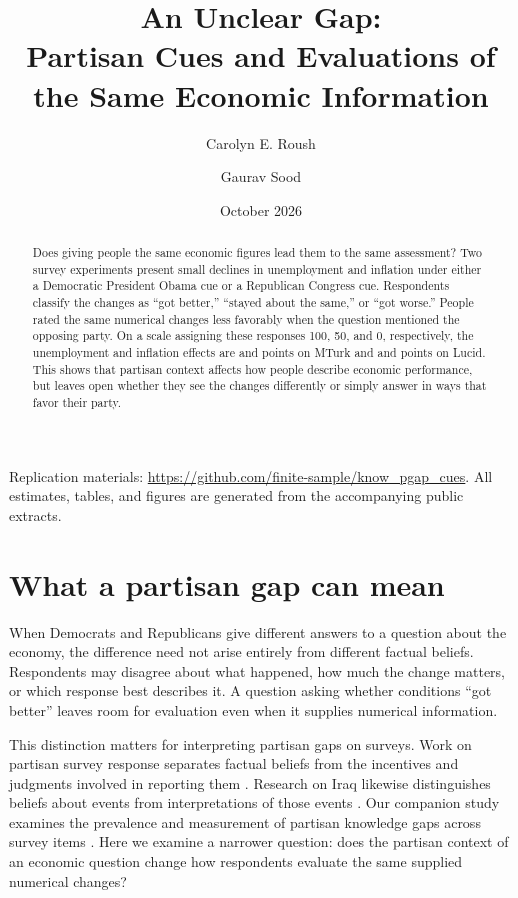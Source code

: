 \documentclass[11pt,letterpaper]{article}
\title{An Unclear Gap:\\Partisan Cues and Evaluations of\\the Same Economic Information}
\author{Carolyn E. Roush \and Gaurav Sood}
\date{October 2026}
\begin{document}
\maketitle
\begin{abstract}
\noindent Does giving people the same economic figures lead them to the same assessment? Two survey experiments present small declines in unemployment and inflation under either a Democratic President Obama cue or a Republican Congress cue. Respondents classify the changes as ``got better,'' ``stayed about the same,'' or ``got worse.'' People rated the same numerical changes less favorably when the question mentioned the opposing party. On a scale assigning these responses 100, 50, and 0, respectively, the unemployment and inflation effects are \MTurkunemploymentestimate{} and \MTurkinflationestimate{} points on MTurk and \Lucidunemploymentestimate{} and \Lucidinflationestimate{} points on Lucid. This shows that partisan context affects how people describe economic performance, but leaves open whether they see the changes differently or simply answer in ways that favor their party.
\end{abstract}
\vspace{1em}
\noindent\small Replication materials: \url{https://github.com/finite-sample/know_pgap_cues}. All estimates, tables, and figures are generated from the accompanying public extracts.\normalsize
\newpage
\section{What a partisan gap can mean}
When Democrats and Republicans give different answers to a question about the economy, the difference need not arise entirely from different factual beliefs. Respondents may disagree about what happened, how much the change matters, or which response best describes it. A question asking whether conditions ``got better'' leaves room for evaluation even when it supplies numerical information.

This distinction matters for interpreting partisan gaps on surveys. Work on partisan survey response separates factual beliefs from the incentives and judgments involved in reporting them \citep{bullock2019}. Research on Iraq likewise distinguishes beliefs about events from interpretations of those events \citep{gaines2007}. Our companion study examines the prevalence and measurement of partisan knowledge gaps across survey items \citep{roush2023}. Here we examine a narrower question: does the partisan context of an economic question change how respondents evaluate the same supplied numerical changes?
\end{document}
